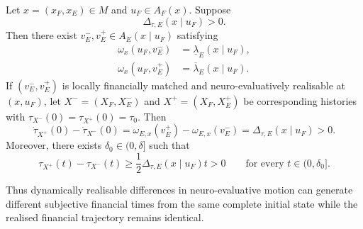 \documentclass[graybox,natbib]{SNmult}
\providecommand{\1}{}
\renewcommand{\1}{\mathbbm 1}
\begin{document}
\begin{theorem}
\label{thm:neuro-temporal-divergence}

Let \(x=(x_F,x_E)\in M\) and \(u_F\in A_F(x)\). Suppose
\begin{equation}
\Delta_{\tau,E}(x\mid u_F)>0.
\label{eq:positive-neuro-dispersion}
\end{equation}
Then there exist
\(v_E^-,v_E^+\in A_E(x\mid u_F)\) satisfying
\begin{align}
\omega_x(u_F,v_E^-)
&=
\underline\lambda_E(x\mid u_F),
\label{eq:conditional-minimizer}
\\
\omega_x(u_F,v_E^+)
&=
\overline\lambda_E(x\mid u_F).
\label{eq:conditional-maximizer}
\end{align}
If \((v_E^-,v_E^+)\) is locally financially matched and neuro-evaluatively
realisable at \((x,u_F)\), let
\(X^-=(X_F,X_E^-)\) and \(X^+=(X_F,X_E^+)\) be corresponding histories with
\(\tau_{X^-}(0)=\tau_{X^+}(0)=\tau_0\). Then
\begin{equation}
\dot\tau_{X^+}(0)-\dot\tau_{X^-}(0)
=
\omega_{E,x}(v_E^+)-\omega_{E,x}(v_E^-)
=
\Delta_{\tau,E}(x\mid u_F)
>0.
\label{eq:initial-neuro-rate-gap}
\end{equation}
Moreover, there exists \(\delta_0\in(0,\delta]\) such that
\begin{equation}
\tau_{X^+}(t)-\tau_{X^-}(t)
\geq
\frac{1}{2}
\Delta_{\tau,E}(x\mid u_F)t
>0
\qquad
\text{for every }t\in(0,\delta_0].
\label{eq:persistent-neuro-divergence}
\end{equation}

Thus dynamically realisable differences in neuro-evaluative motion can
generate different subjective financial times from the same complete initial
state while the realised financial trajectory remains identical.
\end{theorem}
\end{document}
